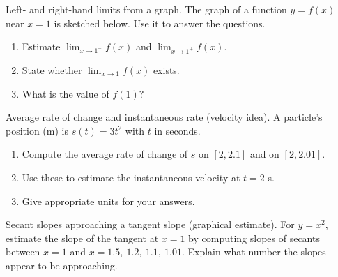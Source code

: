 \documentclass[11pt]{article}
\def\textbf#1{#1}%
\newcounter{question}
\begin{document}
\begin{question}
\textbf{Left- and right-hand limits from a graph.}
The graph of a function $y=f(x)$ near $x=1$ is sketched below. Use it to answer the questions.
\begin{enumerate}
  \item Estimate $\displaystyle\lim_{x\to 1^-} f(x)$ and $\displaystyle\lim_{x\to 1^+} f(x)$.
  \item State whether $\displaystyle\lim_{x\to 1} f(x)$ exists.
  \item What is the value of $f(1)$?
\end{enumerate}

\begin{center}
\end{center}
\end{question}

\begin{question}
\textbf{Average rate of change and instantaneous rate (velocity idea).}
A particle’s position (m) is $s(t)=3t^{2}$ with $t$ in seconds.
\begin{enumerate}
  \item Compute the average rate of change of $s$ on $[2,2.1]$ and on $[2,2.01]$.
  \item Use these to estimate the instantaneous velocity at $t=2$ s.
  \item Give appropriate units for your answers.
\end{enumerate}
\end{question}

\begin{question}
\textbf{Secant slopes approaching a tangent slope (graphical estimate).}
For $y=x^{2}$, estimate the slope of the tangent at $x=1$ by computing slopes of secants between $x=1$ and
$x=1.5,\ 1.2,\ 1.1,\ 1.01$. Explain what number the slopes appear to be approaching.
\begin{center}
\end{center}
\end{question}
\end{document}
